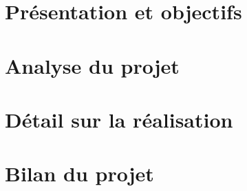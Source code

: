 \documentclass[a4paper,12pt]{report}
\begin{document}
		
	
	\tableofcontents	
		
	
	\part{Présentation et objectifs}
	
	
	
	\part{Analyse du projet}
	
	
	
	
	\part{Détail sur la réalisation}
	
	
	\part{Bilan du projet}
	
	
	

	
		
	\newpage
	\appendix
	
	
\end{document}

